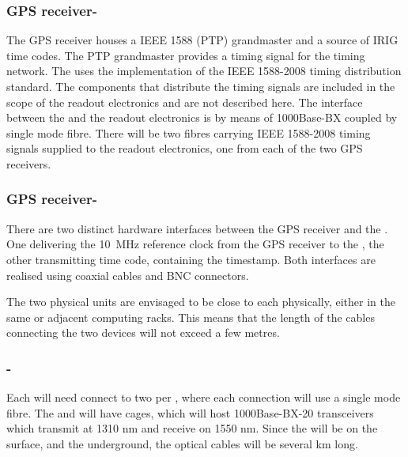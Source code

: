 \documentclass{article}
\begin{document}
\subsubsection{GPS receiver-}
The GPS receiver houses a IEEE 1588 (PTP) grandmaster and a source of IRIG time codes. The PTP grandmaster provides a timing signal for the   timing network. The  uses the  implementation of the IEEE 1588-2008 timing distribution standard. The components that distribute the timing signals are included in the scope of the  readout electronics and are not described here. The interface between the  and the  readout electronics is by means of 1000Base-BX  coupled by single mode fibre. There will be two fibres carrying IEEE 1588-2008 timing signals supplied to the  readout electronics, one from each of the two GPS receivers.

\subsubsection{GPS receiver-}
There are two distinct hardware interfaces between the GPS receiver and the . One delivering the \SI{10}{\MHz} reference clock from the GPS receiver to the , the other transmitting  time code, containing the  timestamp. Both interfaces are realised using coaxial cables and BNC connectors.

The two physical units are envisaged to be close to each physically, either in the same or adjacent computing racks. This means that the length of the cables connecting the two devices will not exceed a few metres.

\subsubsection{-}
Each  will need connect to two  per , where each connection will use a single mode fibre. The  and  will have  cages, which will host 1000Base-BX-20  transceivers which transmit at 1310 nm and receive on 1550 nm. Since the  will be on the surface, and the  underground, the optical cables will be several km long.
\end{document}
